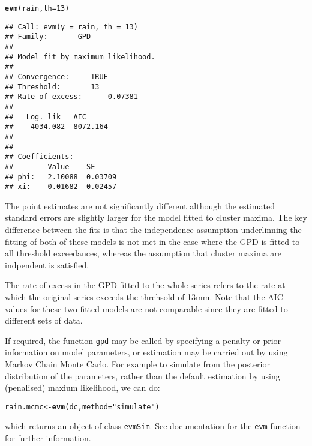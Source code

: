 \documentclass[10pt]{article}\usepackage[]{graphicx}\usepackage[]{color}
\makeatletter
\newcommand{\hlnum}[1]{\textcolor[rgb]{0.686,0.059,0.569}{#1}}%
\newcommand{\hlstr}[1]{\textcolor[rgb]{0.192,0.494,0.8}{#1}}%
\newcommand{\hlstd}[1]{\textcolor[rgb]{0.345,0.345,0.345}{#1}}%
\newcommand{\hlkwb}[1]{\textcolor[rgb]{0.69,0.353,0.396}{#1}}%
\newcommand{\hlkwc}[1]{\textcolor[rgb]{0.333,0.667,0.333}{#1}}%
\newcommand{\hlkwd}[1]{\textcolor[rgb]{0.737,0.353,0.396}{\textbf{#1}}}%
\newenvironment{kframe}{%
 \def\at@end@of@kframe{}%
 \ifinner\ifhmode%
  \def\at@end@of@kframe{\end{minipage}}%
  \begin{minipage}{\columnwidth}%
 \fi\fi%
 \def\FrameCommand##1{\hskip\@totalleftmargin \hskip-\fboxsep
 \colorbox{shadecolor}{##1}\hskip-\fboxsep
     \hskip-\linewidth \hskip-\@totalleftmargin \hskip\columnwidth}%
 \MakeFramed {\advance\hsize-\width
   \@totalleftmargin\z@ \linewidth\hsize
   \@setminipage}}%
 {\par\unskip\endMakeFramed%
 \at@end@of@kframe}
\newenvironment{knitrout}{}{} %
\makeatother
\begin{document}
\begin{knitrout}
\color{fgcolor}\begin{kframe}
\begin{alltt}
\hlkwd{evm}\hlstd{(rain,}\hlkwc{th}\hlstd{=}\hlnum{13}\hlstd{)}
\end{alltt}
\begin{verbatim}
## Call: evm(y = rain, th = 13)
## Family:       GPD 
## 
## Model fit by maximum likelihood.
## 
## Convergence:		TRUE
## Threshold:		13
## Rate of excess:		0.07381
## 
##   Log. lik   AIC     
##   -4034.082  8072.164
## 
## 
## Coefficients:
##        Value    SE     
## phi:   2.10088  0.03709
## xi:    0.01682  0.02457
\end{verbatim}
\end{kframe}
\end{knitrout}

The point estimates are not significantly different although the estimated standard errors are slightly larger for the model fitted to cluster maxima.  The key difference between the fits is that the independence assumption underlinning the fitting of both of these models is not met in the case where the GPD is fitted to all threshold exceedances, whereas the assumption that cluster maxima are indpendent is satisfied.

The rate of excess in the GPD fitted to the whole series refers to the rate at which the original series exceeds the threhsold of 13mm.  Note that the AIC values for these two fitted models are not comparable since they are fitted to different sets of data.

If required, the function {\tt gpd} may be called by specifying a penalty or prior information on model parameters, or estimation may be carried out by using Markov Chain Monte Carlo. For example to simulate from the posterior distribution of the parameters, rather than the default estimation by using (penalised) maxium likelihood, we can do:
\begin{knitrout}
\color{fgcolor}\begin{kframe}
\begin{alltt}
\hlstd{rain.mcmc} \hlkwb{<-} \hlkwd{evm}\hlstd{(dc,}\hlkwc{method}\hlstd{=}\hlstr{"simulate"}\hlstd{)}
\end{alltt}
\end{kframe}
\end{knitrout}
which returns an object of class {\tt evmSim}. See documentation for the {\tt evm} function for further information.
\end{document}
